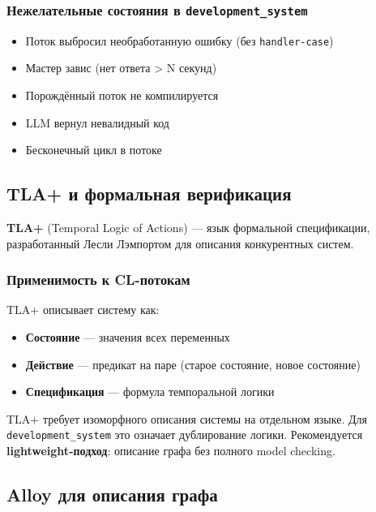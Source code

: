 \documentclass[10pt, oneside]{article}
\begin{document}
\subsubsection{Нежелательные состояния в \texttt{development\_system}}

\begin{itemize}[leftmargin=1.5em]
  \item Поток выбросил необработанную ошибку (без \texttt{handler-case})
  \item Мастер завис (нет ответа > N секунд)
  \item Порождённый поток не компилируется
  \item LLM вернул невалидный код
  \item Бесконечный цикл в потоке
\end{itemize}

\subsection{TLA+ и формальная верификация}

\textbf{TLA+} (Temporal Logic of Actions) --- язык формальной спецификации,
разработанный Лесли Лэмпортом для описания конкурентных систем.

\subsubsection{Применимость к CL-потокам}

TLA+ описывает систему как:
\begin{itemize}[leftmargin=1.5em]
  \item \textbf{Состояние} --- значения всех переменных
  \item \textbf{Действие} --- предикат на паре (старое состояние, новое состояние)
  \item \textbf{Спецификация} --- формула темпоральной логики
\end{itemize}

\begin{warningbox}[title={Ограничения TLA+}]
TLA+ требует изоморфного описания системы на отдельном языке.
Для \texttt{development\_system} это означает дублирование логики.
Рекомендуется \textbf{lightweight-подход}: описание графа без
полного model checking.
\end{warningbox}

\subsection{Alloy для описания графа}
\end{document}
